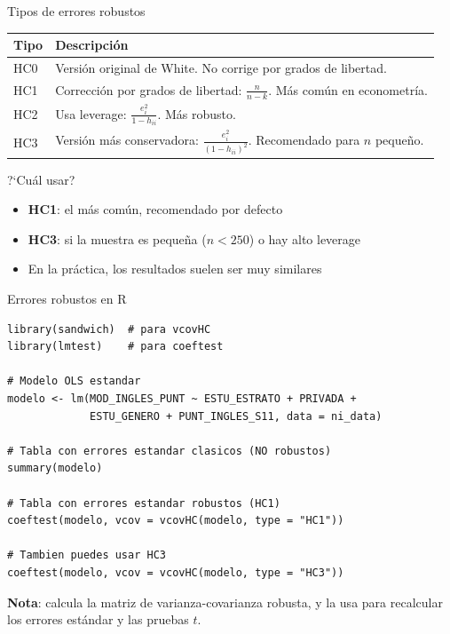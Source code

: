 \documentclass[aspectratio=169, 11pt]{beamer}
\begin{document}
\begin{frame}{Tipos de errores robustos}
\begin{center}
\renewcommand{\arraystretch}{1.2}
\small
\begin{tabular}{lp{7cm}}
\toprule
\textbf{Tipo} & \textbf{Descripci\'on} \\
\midrule
HC0 & Versi\'on original de White. No corrige por grados de libertad. \\
HC1 & Correcci\'on por grados de libertad: $\frac{n}{n-k}$. M\'as com\'un en econometr\'ia. \\
HC2 & Usa leverage: $\frac{e_i^2}{1 - h_{ii}}$. M\'as robusto. \\
HC3 & Versi\'on m\'as conservadora: $\frac{e_i^2}{(1 - h_{ii})^2}$. Recomendado para $n$ peque\~no. \\
\bottomrule
\end{tabular}
\end{center}

\begin{block}{?`Cu\'al usar?}
\begin{itemize}
\item \textbf{HC1}: el más común, recomendado por defecto
\item \textbf{HC3}: si la muestra es pequeña ($n < 250$) o hay alto leverage
\item En la práctica, los resultados suelen ser muy similares
\end{itemize}
\end{block}
\end{frame}

\begin{frame}[fragile]{Errores robustos en R}
\begin{lstlisting}
library(sandwich)  # para vcovHC
library(lmtest)    # para coeftest

# Modelo OLS estandar
modelo <- lm(MOD_INGLES_PUNT ~ ESTU_ESTRATO + PRIVADA +
             ESTU_GENERO + PUNT_INGLES_S11, data = ni_data)

# Tabla con errores estandar clasicos (NO robustos)
summary(modelo)

# Tabla con errores estandar robustos (HC1)
coeftest(modelo, vcov = vcovHC(modelo, type = "HC1"))

# Tambien puedes usar HC3
coeftest(modelo, vcov = vcovHC(modelo, type = "HC3"))
\end{lstlisting}

\vspace{0.15cm}
\small
\textbf{Nota}:  calcula la matriz de varianza-covarianza robusta, y  la usa para recalcular los errores estándar y las pruebas $t$.
\end{frame}
\end{document}
